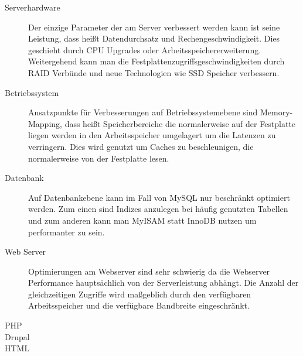 \begin{description}
  \item[Serverhardware] Der einzige Parameter der am Server verbessert werden kann ist seine Leistung, dass heißt Datendurchsatz und Rechengeschwindigkeit. Dies geschieht durch CPU Upgrades oder Arbeitsspeichererweiterung. Weitergehend kann man die Festplattenzugriffsgeschwindigkeiten durch RAID Verbünde und neue Technologien wie SSD Speicher verbessern. 
  \item[Betriebssystem] Ansatzpunkte für Verbesserungen auf Betriebssystemebene sind Memory-Mapping, dass heißt Speicherbereiche die normalerweise auf der Festplatte liegen werden in den Arbeitsspeicher umgelagert um die Latenzen zu verringern. Dies wird genutzt um Caches zu beschleunigen, die normalerweise von der Festplatte lesen.
  \item[Datenbank] Auf Datenbankebene kann im Fall von MySQL nur beschränkt optimiert werden. Zum einen sind Indizes anzulegen bei häufig genutzten Tabellen und zum anderen kann man MyISAM statt InnoDB nutzen um performanter zu sein.
  \item[Web Server] Optimierungen am Webserver sind sehr schwierig da die Webserver Performance hauptsächlich von der Serverleistung abhängt. Die Anzahl der gleichzeitigen Zugriffe wird maßgeblich durch den verfügbaren Arbeitsspeicher und die verfügbare Bandbreite eingeschränkt.
  \item[PHP] 
  \item[Drupal] 
  \item[HTML] 
\end{description}